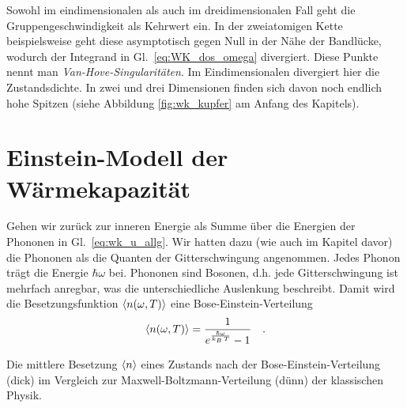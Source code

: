 Sowohl im eindimensionalen als auch im dreidimensionalen Fall geht die Gruppengeschwindigkeit als Kehrwert ein. In der zweiatomigen Kette beispielsweise geht diese asymptotisch gegen Null in der Nähe der Bandlücke, wodurch der Integrand in Gl.~\ref{eq:WK_dos_omega} divergiert. Diese Punkte nennt man \emph{Van-Hove-Singularitäten}. Im Eindimensionalen divergiert hier die Zustandsdichte. In zwei und drei Dimensionen finden sich davon noch endlich hohe Spitzen (siehe Abbildung \ref{fig:wk_kupfer} am Anfang des Kapitels).





\section{Einstein-Modell der Wärmekapazität}

Gehen wir zurück zur inneren Energie als Summe über die Energien der Phononen in Gl.~\ref{eq:wk_u_allg}. Wir hatten dazu (wie auch im Kapitel davor) die Phononen als die Quanten der Gitterschwingung angenommen. Jedes Phonon trägt die Energie $\hbar \omega$ bei. Phononen sind Bosonen, d.h. jede Gitterschwingung ist mehrfach anregbar, was die unterschiedliche Auslenkung beschreibt. Damit wird die Besetzungsfunktion $\braket{n (\omega,T) }$ eine Bose-Einstein-Verteilung
\begin{equation}
\braket{n (\omega,T) } = \frac{1}{e^{\frac{\hbar \omega}{k_B \, T} }- 1} \quad .
\end{equation}

\begin{marginfigure}

\caption{Die mittlere Besetzung $\braket{n}$ eines Zustands nach der Bose-Einstein-Verteilung (dick) im Vergleich zur Maxwell-Boltzmann-Verteilung (dünn) der klassischen Physik.}
\end{marginfigure}



